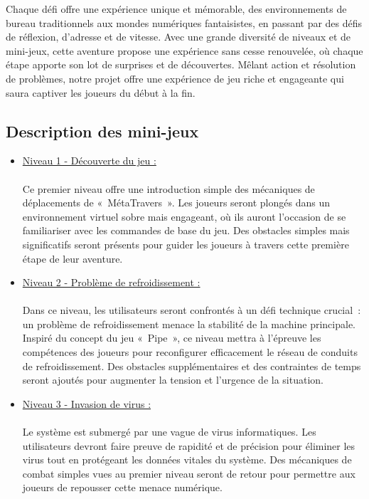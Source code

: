 \documentclass[12pt,a4paper]{article}
\begin{document}
            \tabto{1cm} Chaque défi offre une expérience unique et mémorable, des environnements de bureau traditionnels aux mondes numériques fantaisistes, en passant par des défis de réflexion, d'adresse et de vitesse. Avec une grande diversité de niveaux et de mini-jeux, cette aventure propose une expérience sans cesse renouvelée, où chaque étape apporte son lot de surprises et de découvertes. Mêlant action et résolution de problèmes, notre projet offre une expérience de jeu riche et engageante qui saura captiver les joueurs du début à la fin.
            
        \subsection{Description des mini-jeux}
        
            \begin{itemize}
            
                \item \tabto{1cm} \underline{Niveau 1 - Découverte du jeu :} \\\\
                \tabto{1cm} Ce premier niveau offre une introduction simple des mécaniques de déplacements de «~MétaTravers~». Les joueurs seront plongés dans un environnement virtuel sobre mais engageant, où ils auront l'occasion de se familiariser avec les commandes de base du jeu. Des obstacles simples mais significatifs seront présents pour guider les joueurs à travers cette première étape de leur aventure.\\
                
                \item \tabto{1cm} \underline{Niveau 2 - Problème de refroidissement :}\\\\
                \tabto{1cm} Dans ce niveau, les utilisateurs seront confrontés à un défi technique crucial~: un problème de refroidissement menace la stabilité de la machine principale. Inspiré du concept du jeu «~Pipe~», ce niveau mettra à l'épreuve les compétences des joueurs pour reconfigurer efficacement le réseau de conduits de refroidissement. Des obstacles supplémentaires et des contraintes de temps seront ajoutés pour augmenter la tension et l'urgence de la situation.\\

                \item \tabto{1cm} \underline{Niveau 3 - Invasion de virus :}\\\\
                \tabto{1cm} Le système est submergé par une vague de virus informatiques. Les utilisateurs devront faire preuve de rapidité et de précision pour éliminer les virus tout en protégeant les données vitales du système. Des mécaniques de combat simples vues au premier niveau seront de retour pour permettre aux joueurs de repousser cette menace numérique.\\
                

\end{itemize}
\end{document}
